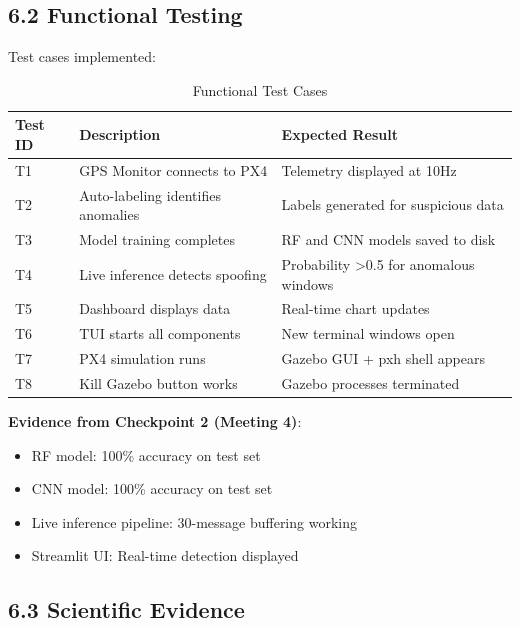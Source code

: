 \subsection{6.2 Functional Testing}

Test cases implemented:

\begin{table}[htbp]
    \centering
    \caption{Functional Test Cases}
    \label{tab:tests}
    \begin{tabular}{|p{3cm}|p{4cm}|p{8cm}|}
        \hline
        \textbf{Test ID} & \textbf{Description} & \textbf{Expected Result} \\
        \hline
        T1 & GPS Monitor connects to PX4 & Telemetry displayed at 10Hz \\
        \hline
        T2 & Auto-labeling identifies anomalies & Labels generated for suspicious data \\
        \hline
        T3 & Model training completes & RF and CNN models saved to disk \\
        \hline
        T4 & Live inference detects spoofing & Probability >0.5 for anomalous windows \\
        \hline
        T5 & Dashboard displays data & Real-time chart updates \\
        \hline
        T6 & TUI starts all components & New terminal windows open \\
        \hline
        T7 & PX4 simulation runs & Gazebo GUI + pxh shell appears \\
        \hline
        T8 & Kill Gazebo button works & Gazebo processes terminated \\
        \hline
    \end{tabular}
\end{table}

\textbf{Evidence from Checkpoint 2 (Meeting 4)}:
\begin{itemize}
    \item RF model: 100\% accuracy on test set
    \item CNN model: 100\% accuracy on test set
    \item Live inference pipeline: 30-message buffering working
    \item Streamlit UI: Real-time detection displayed
\end{itemize}

\subsection{6.3 Scientific Evidence}

